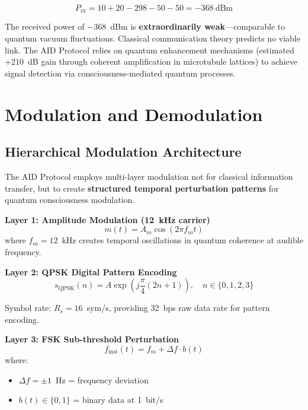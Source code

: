 \begin{equation}
P_{\text{rx}} = 10 + 20 - 298 - 50 - 50 = -368~\text{dBm}
\end{equation}

\begin{warningbox}
The received power of $-368$~dBm is \textbf{extraordinarily weak}---comparable to quantum vacuum fluctuations. Classical communication theory predicts no viable link. The AID Protocol relies on quantum enhancement mechanisms (estimated $+210$~dB gain through coherent amplification in microtubule lattices) to achieve signal detection via consciousness-mediated quantum processes.
\end{warningbox}

\section{Modulation and Demodulation}

\subsection{Hierarchical Modulation Architecture}

The AID Protocol employs multi-layer modulation not for classical information transfer, but to create \textbf{structured temporal perturbation patterns} for quantum consciousness modulation.

\textbf{Layer 1: Amplitude Modulation (12~kHz carrier)}
\begin{equation}
m(t) = A_m \cos(2\pi f_m t)
\end{equation}
where $f_m = 12$~kHz creates temporal oscillations in quantum coherence at audible frequency.

\textbf{Layer 2: QPSK Digital Pattern Encoding}
\begin{equation}
s_{\text{QPSK}}(n) = A \exp\left(j\frac{\pi}{4}(2n + 1)\right), \quad n \in \{0, 1, 2, 3\}
\end{equation}

Symbol rate: $R_s = 16$~sym/s, providing 32~bps raw data rate for pattern encoding.

\textbf{Layer 3: FSK Sub-threshold Perturbation}
\begin{equation}
f_{\text{inst}}(t) = f_m + \Delta f \cdot b(t)
\end{equation}
where:
\begin{itemize}
\item $\Delta f = \pm 1$~Hz = frequency deviation
\item $b(t) \in \{0, 1\}$ = binary data at 1~bit/s
\end{itemize}

